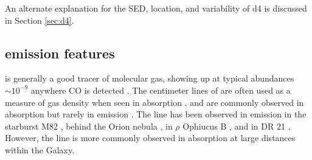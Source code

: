 An alternate explanation for the SED, location, and variability of d4 is
discussed in Section \ref{sec:d4}.





\subsection{\formaldehyde emission features}
\label{sec:h2coemission}

\formaldehyde is generally a good tracer of molecular gas, showing up at typical
abundances $\sim10^{-9}$ \hh anywhere CO is detected \citep[e.g.][]{Mangum1993a}.
The centimeter lines of \ortho are often used as a measure of gas density when
seen in absorption \citep[e.g.][]{Ginsburg2011a,Zeiger2010a}.
\ortho \oneone and \twotwo are commonly observed in absorption
but rarely in emission \citep[e.g.][]{Mangum1993a,Araya2007b}.  The \twotwo
line has been observed in emission in the starburst M82 \citep{Mangum2008a},
behind the Orion nebula
\citep{Evans1975a,Kutner1976a,Batrla1983a,Johnston1983a,Bastien1985a,Wilson1989a},
in $\rho$ Ophiucus B
\citep{Loren1980a,Loren1983a,Martin-Pintado1983a,Wadiak1985a}, and in DR 21
\citep{Wilson1982a,Johnston1984a}.  However, the \twotwo line is more commonly
observed in absorption at large distances within the Galaxy.

